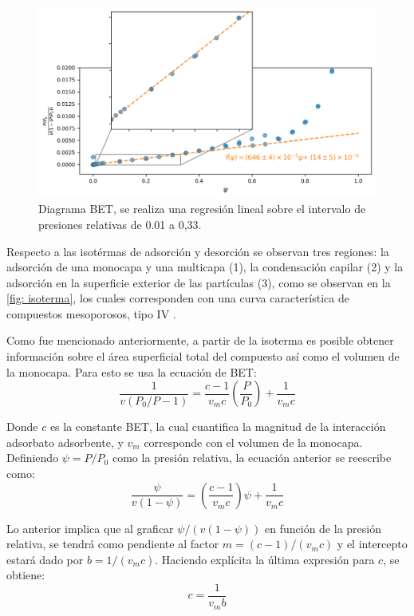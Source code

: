 \documentclass[fleqn,11pt]{SelfArx}
\begin{document}
	\begin{figure}[h]
		\centering
		\includegraphics[width=\linewidth]{BET}
		\caption{Diagrama BET, se realiza una regresi\'on lineal sobre el intervalo de presiones relativas de 0.01 a 0,33.}
		\label{fig: bet}
	\end{figure}
	
	Respecto a las isot\'ermas de adsorci\'on y desorci\'on se observan tres regiones: la adsorci\'on de una monocapa y una multicapa (1), la condensaci\'on capilar (2) y la adsorci\'on en la superficie exterior de las part\'iculas (3), como se observan en la \autoref{fig: isoterma}, los cuales corresponden con una curva caracter\'istica de compuestos mesoporosos, tipo IV \cite{vargas_legnoverde_giraldo_basaldella_moreno-pirajan_2010}.
	
	Como fue mencionado anteriormente, a partir de la isoterma es posible obtener informaci\'on sobre el \'area superficial total del compuesto as\'i como el volumen de la monocapa. Para esto se usa la ecuaci\'on de BET:
	\begin{equation}
		\dfrac{1}{v(P_0/P - 1)} = \dfrac{c-1}{v_mc}\left(\dfrac{P}{P_0}\right) + \dfrac{1}{v_mc}
	\end{equation}
	
	Donde $c$ es la constante BET, la cual cuantifica la magnitud de la interacci\'on adsorbato adsorbente, y $v_m$ corresponde con el volumen de la monocapa. Definiendo $\psi = P/P_0$ como la presi\'on relativa, la ecuaci\'on anterior se reescribe como:
	\begin{equation}
		\dfrac{\psi}{v(1-\psi)} = \left(\dfrac{c-1}{v_mc}\right)\psi + \dfrac{1}{v_mc}
	\end{equation}
	
	Lo anterior implica que al graficar $\psi/(v(1-\psi))$ en funci\'on de la presi\'on relativa, se tendr\'a como pendiente al factor $m = (c-1)/(v_mc)$ y el intercepto estar\'a dado por $b = 1/(v_mc)$. Haciendo expl\'icita la \'ultima expresi\'on para $c$, se obtiene:
	\begin{equation}
		c = \dfrac{1}{v_mb}
	\end{equation}
	
\end{document}
